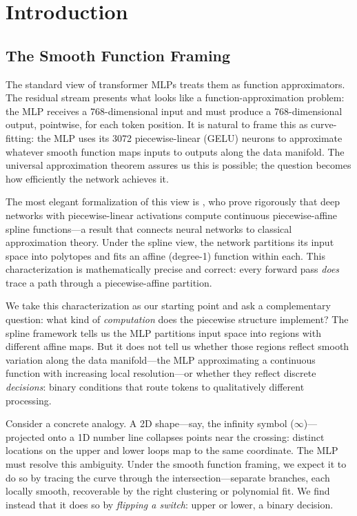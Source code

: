 \documentclass{article}
\begin{document}
\section{Introduction}

\subsection{The Smooth Function Framing}

The standard view of transformer MLPs treats them as function approximators. The residual
stream presents what looks like a function-approximation problem: the MLP receives a
768-dimensional input and must produce a 768-dimensional output, pointwise, for each token
position. It is natural to frame this as curve-fitting: the MLP uses its 3072 piecewise-linear
(GELU) neurons to approximate whatever smooth function maps inputs to outputs along the data
manifold. The universal approximation theorem assures us this is possible; the question becomes
how efficiently the network achieves it.

The most elegant formalization of this view is \citet{balestriero2018spline}, who prove
rigorously that deep networks with piecewise-linear activations compute continuous
piecewise-affine spline functions---a result that connects neural networks to
classical approximation theory. Under the spline view, the network partitions its input space
into polytopes and fits an affine (degree-1) function within each. This characterization is
mathematically precise and correct: every forward pass \emph{does} trace a path through a
piecewise-affine partition.

We take this characterization as our starting point and ask a complementary question:
what kind of \emph{computation} does the piecewise structure implement?
The spline framework tells us the MLP partitions input space into regions with different
affine maps. But it does not tell us whether those regions reflect smooth variation along the
data manifold---the MLP approximating a continuous function with increasing local
resolution---or whether they reflect discrete \emph{decisions}: binary conditions that
route tokens to qualitatively different processing.

Consider a concrete analogy. A 2D shape---say, the infinity symbol ($\infty$)---projected
onto a 1D number line collapses points near the crossing: distinct locations on the upper and
lower loops map to the same coordinate. The MLP must resolve this ambiguity. Under the smooth
function framing, we expect it to do so by tracing the curve through the
intersection---separate branches, each locally smooth, recoverable by the right clustering
or polynomial fit. We find instead that it does so by \emph{flipping a switch}: upper or
lower, a binary decision.
\end{document}
